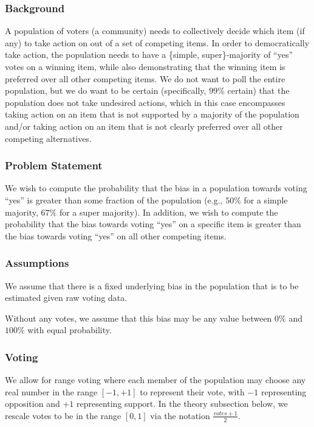 \documentclass[chi_draft]{sigchi}
\begin{document}
\subsubsection{Background}
A population of voters (a community) needs to collectively decide which item (if any) to take action on out of a set of competing items.
In order to democratically take action, the population needs to have a \{simple, super\}-majority of ``yes'' votes on a
winning item, while also demonstrating that the winning item is preferred over all other competing items.
We do not want to poll the entire population, but we do want to be certain (specifically, $99\%$ certain) that
the population does not take undesired actions, which in this case encompasses taking action on an item that is not
supported by a majority of the population and/or taking action on an item that is not clearly preferred over all
other competing alternatives.

\subsubsection{Problem Statement}
We wish to compute the probability that the bias in a population towards voting ``yes'' is greater than some
fraction of the population (e.g., $50\%$ for a simple majority, $67\%$ for a super majority).
In addition, we wish to compute the probability that the bias towards voting ``yes'' on a specific item is greater
than the bias towards voting ``yes'' on all other competing items.

\subsubsection{Assumptions}
We assume that there is a fixed underlying bias in the population that is to be estimated given raw voting data.

Without any votes, we assume that this bias may be any value between $0\%$ and $100\%$ with equal probability.

\subsubsection{Voting}
We allow for range voting where each member of the population may choose any real number in the range $[-1,+1]$ to
represent their vote, with $-1$ representing opposition and $+1$ representing support.
In the theory subsection below, we rescale votes to be in the range $[0,1]$ via the notation $\frac{votes + 1}{2}$.
\end{document}
